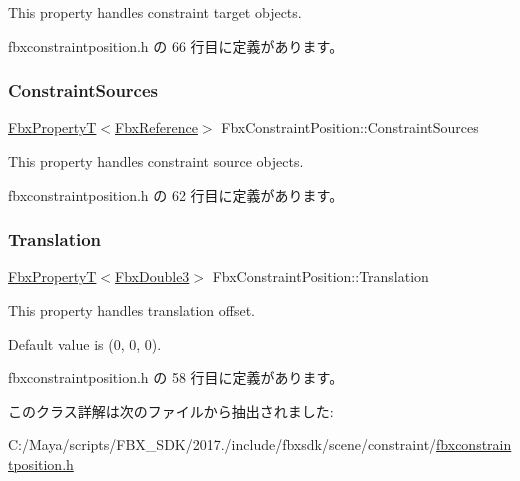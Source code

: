 This property handles constraint target objects. 

 fbxconstraintposition.\+h の 66 行目に定義があります。

\mbox{\label{class_fbx_constraint_position_a52d5190a6c10807e4f52383d05ceae38}} 
\subsubsection{\texorpdfstring{Constraint\+Sources}{ConstraintSources}}
{\footnotesize\ttfamily \hyperlink{class_fbx_property_t}{Fbx\+PropertyT}$<$\hyperlink{fbxtypes_8h_a44df6a2eec915cf27cd481e5c5e48a24}{Fbx\+Reference}$>$ Fbx\+Constraint\+Position\+::\+Constraint\+Sources}

This property handles constraint source objects. 

 fbxconstraintposition.\+h の 62 行目に定義があります。

\mbox{\label{class_fbx_constraint_position_a90906bf60f276cd04cb1afebce8b9816}} 
\subsubsection{\texorpdfstring{Translation}{Translation}}
{\footnotesize\ttfamily \hyperlink{class_fbx_property_t}{Fbx\+PropertyT}$<$\hyperlink{fbxtypes_8h_ae0a96f14cde566774c7553aa7523b7a7}{Fbx\+Double3}$>$ Fbx\+Constraint\+Position\+::\+Translation}

This property handles translation offset.

Default value is (0, 0, 0). 

 fbxconstraintposition.\+h の 58 行目に定義があります。



このクラス詳解は次のファイルから抽出されました\+:\begin{DoxyCompactItemize}
\item 
C\+:/\+Maya/scripts/\+F\+B\+X\+\_\+\+S\+D\+K/2017./include/fbxsdk/scene/constraint/\hyperlink{fbxconstraintposition_8h}{fbxconstraintposition.\+h}\end{DoxyCompactItemize}
